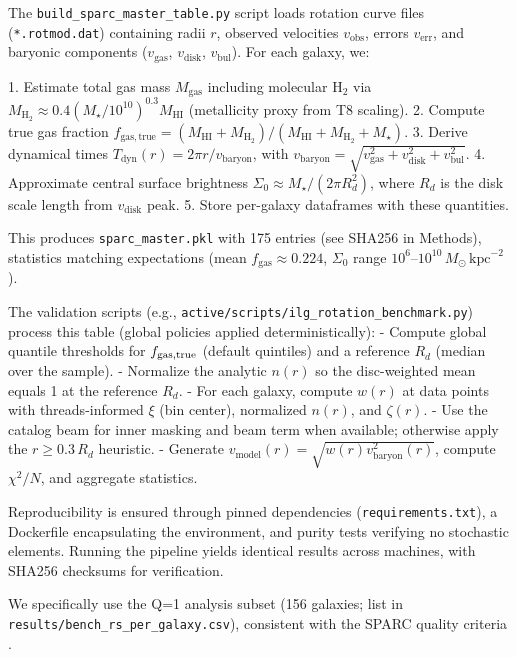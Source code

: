 \documentclass[12pt,a4paper]{article}
\begin{document}
The \texttt{build\_sparc\_master\_table.py} script loads rotation curve files (\texttt{*.rotmod.dat}) containing radii $r$, observed velocities $v_\mathrm{obs}$, errors $v_\mathrm{err}$, and baryonic components ($v_\mathrm{gas}$, $v_\mathrm{disk}$, $v_\mathrm{bul}$). For each galaxy, we:

1. Estimate total gas mass $M_\mathrm{gas}$ including molecular H$_2$ via $M_\mathrm{H_2} \approx 0.4 (M_\star / 10^{10})^{0.3} M_\mathrm{HI}$ (metallicity proxy from T8 scaling).
2. Compute true gas fraction $f_\mathrm{gas,true} = (M_\mathrm{HI} + M_\mathrm{H_2}) / (M_\mathrm{HI} + M_\mathrm{H_2} + M_\star)$.
3. Derive dynamical times $T_\mathrm{dyn}(r) = 2\pi r / v_\mathrm{baryon}$, with $v_\mathrm{baryon} = \sqrt{v_\mathrm{gas}^2 + v_\mathrm{disk}^2 + v_\mathrm{bul}^2}$.
4. Approximate central surface brightness $\Sigma_0 \approx M_\star / (2\pi R_d^2)$, where $R_d$ is the disk scale length from $v_\mathrm{disk}$ peak.
5. Store per-galaxy dataframes with these quantities.

This produces \texttt{sparc\_master.pkl} with 175 entries (see SHA256 in Methods), statistics matching expectations (mean $f_\mathrm{gas} \approx 0.224$, $\Sigma_0$ range $10^6$--$10^{10}\,M_\odot\,\mathrm{kpc}^{-2}$).

The validation scripts (e.g., \texttt{active/scripts/ilg\_rotation\_benchmark.py}) process this table (global policies applied deterministically):
- Compute global quantile thresholds for $f_{\rm gas,true}$ (default quintiles) and a reference $R_d$ (median over the sample).
- Normalize the analytic $n(r)$ so the disc-weighted mean equals 1 at the reference $R_d$.
- For each galaxy, compute $w(r)$ at data points with threads-informed $\xi$ (bin center), normalized $n(r)$, and $\zeta(r)$.
- Use the catalog beam for inner masking and beam term when available; otherwise apply the $r\ge0.3\,R_d$ heuristic.
- Generate $v_\mathrm{model}(r) = \sqrt{w(r) v_\mathrm{baryon}^2(r)}$, compute $\chi^2/N$, and aggregate statistics.

Reproducibility is ensured through pinned dependencies (\texttt{requirements.txt}), a Dockerfile encapsulating the environment, and purity tests verifying no stochastic elements. Running the pipeline yields identical results across machines, with SHA256 checksums for verification.

We specifically use the Q=1 analysis subset (156 galaxies; list in \texttt{results/bench\_rs\_per\_galaxy.csv}), consistent with the SPARC quality criteria \citep{lelli2016sparc}.
\end{document}
